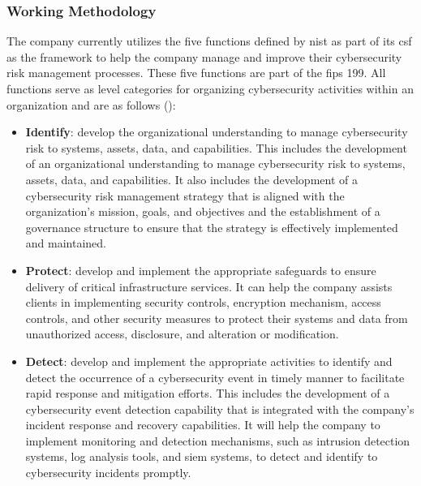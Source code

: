 \begin{multicols}{2}
      \subsubsection{Working Methodology}
      The company currently utilizes the five functions defined by \acrshort{nist} as part of its \acrshort{csf} as
      the framework to help the company manage and improve their cybersecurity risk management processes. These five
      functions are part of the \acrshort{fips} 199. All functions serve as level categories for organizing
      cybersecurity activities within an organization and are as follows (\cite{nist}):
      \begin{itemize}
            \item \textbf{Identify}: develop the organizational understanding to manage cybersecurity risk to
                  systems, assets, data, and capabilities. This includes the development of an organizational
                  understanding to manage cybersecurity risk to systems, assets, data, and capabilities. It also
                  includes the development of a cybersecurity risk management strategy that is aligned with the
                  organization's mission, goals, and objectives and the establishment of a governance structure to
                  ensure that the strategy is effectively implemented and maintained.
            \item \textbf{Protect}: develop and implement the appropriate safeguards to ensure delivery of critical
                  infrastructure services. It can help the company assists clients in implementing security controls,
                  encryption mechanism, access controls, and other security measures to protect their systems and
                  data from unauthorized access, disclosure, and alteration or modification.
            \item \textbf{Detect}: develop and implement the appropriate activities to identify and detect the
                  occurrence of a cybersecurity event in timely manner to facilitate rapid response and mitigation
                  efforts. This includes the development of a cybersecurity event detection capability that is
                  integrated with the company's incident response and recovery capabilities. It will help the
                  company to implement monitoring and detection mechanisms, such as intrusion detection systems,
                  log analysis tools, and \acrshort{siem} systems, to detect and identify to cybersecurity incidents
                  promptly.

\end{itemize}
\end{multicols}
